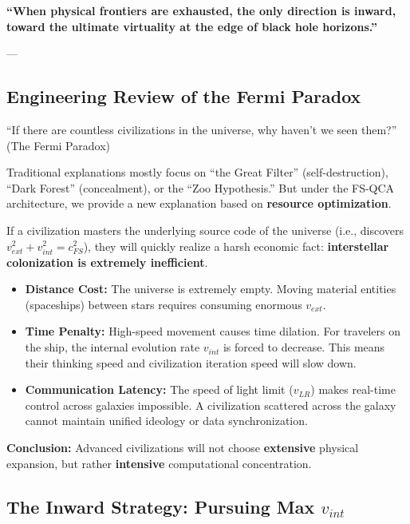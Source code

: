 \documentclass[11pt,a4paper,twoside]{book}
\begin{document}
\textbf{``When physical frontiers are exhausted, the only direction is inward, toward the ultimate virtuality at the edge of black hole horizons.''}

---

\subsection{Engineering Review of the Fermi Paradox}

``If there are countless civilizations in the universe, why haven't we seen them?'' (The Fermi Paradox)

Traditional explanations mostly focus on ``the Great Filter'' (self-destruction), ``Dark Forest'' (concealment), or the ``Zoo Hypothesis.'' But under the FS-QCA architecture, we provide a new explanation based on \textbf{resource optimization}.

If a civilization masters the underlying source code of the universe (i.e., discovers \textbf{$v_{ext}^2 + v_{int}^2 = c_{FS}^2$}), they will quickly realize a harsh economic fact: \textbf{interstellar colonization is extremely inefficient}.

\begin{itemize}
\item \textbf{Distance Cost:} The universe is extremely empty. Moving material entities (spaceships) between stars requires consuming enormous \textbf{$v_{ext}$}.

\item \textbf{Time Penalty:} High-speed movement causes time dilation. For travelers on the ship, the internal evolution rate \textbf{$v_{int}$} is forced to decrease. This means their thinking speed and civilization iteration speed will slow down.

\item \textbf{Communication Latency:} The speed of light limit (\textbf{$v_{LR}$}) makes real-time control across galaxies impossible. A civilization scattered across the galaxy cannot maintain unified ideology or data synchronization.
\end{itemize}

\textbf{Conclusion:} Advanced civilizations will not choose \textbf{extensive} physical expansion, but rather \textbf{intensive} computational concentration.

\subsection{The Inward Strategy: Pursuing Max $v_{int}$}
\end{document}
